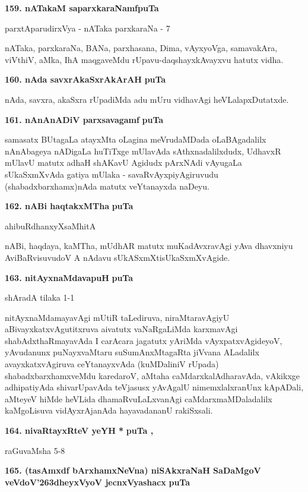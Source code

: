 \medskip
\noindent
\textbf{159. nATakaM saparxkaraNamf}\hfill{\bf puTa }

\hfill{parxtAparudirxVya - nATaka parxkaraNa - 7}

\smallskip
nATaka, parxkaraNa, BANa, parxhasana, Dima, vAyxyoVga, samavakAra, viVthiV, aMka, IhA maqgaveMdu rUpavu-daqshayxkAvayxvu hatutx vidha.

\medskip
\noindent
\textbf{160. nAda savxrAkaSxrAkArAH} \hfill{\bf puTa }

\smallskip
nAda, savxra, akaSxra rUpadiMda adu mUru vidhavAgi heVLalapxDutatxde.


\medskip
\noindent
\textbf{161. nAnAnADiV parxsavagamf} \hfill{\bf puTa }

\smallskip
samasatx BUtagaLa atayxMta oLagina meVrudaMDada oLaBAgadalilx nAnAbageya nADigaLa huTiTxge mUlavAda sAthxnadalilxdudx, UdhavxR mUlavU matutx adhaH shAKavU Agidudx pArxNAdi vAyugaLa sUkaSxmXvAda gatiya mUlaka - savaRvAyxpiyAgiruvudu (shabadxbarxhamx)nAda matutx veYtanayxda naDeyu.

\eject

\noindent
\textbf{162. nABi haqtakxMTha} \hfill{\bf puTa }

\hfill{ahibuRdhanxyXsaMhitA}

\smallskip
nABi, haqdaya, kaMTha, mUdhAR matutx muKadAvxravAgi yAva dhavxniyu AviBaRvisuvudoV A nAdavu sUkASxmXtisUkaSxmXvAgide. 

\medskip
\noindent
\textbf{163. nitAyxnaMdavapuH} \hfill{\bf puTa }

\hfill{shAradA tilaka 1-1}

\smallskip
nitAyxnaMdamayavAgi mUtiR taLediruva, niraMtaravAgiyU aBivayxkatxvAgutitxruva aivatutx vaNaRgaLiMda karxmavAgi shabAdxthaRmayavAda I carAcara jagatutx yAriMda vAyxpatxvAgideyoV, yAvudanunx puNayxvaMtaru suSumAnxMtagaRta \hbox{jiVvana} ALadalilx avayxkatxvAgiruva ceYtanayxvAda (kuMDaliniV rUpada) shabadxbarxhamxveMdu karedaroV, aMtaha caMdarxkalAdharavAda, vAkikxge adhipatiyAda shivarUpavAda teVjasusx yAvAgalU nimemxlalxranUnx kApADali, aMteyeV hiMde heVLida dhamaRvuLaLxvanAgi caMdarxmaMDaladalilx kaMgoLisuva vidAyxrAjanAda hayavadananU rakiSxsali.

\medskip
\noindent
\textbf{164. nivaRtayxRteV yeYH *} \hfill{\bf puTa , }

\hfill{raGuvaMsha 5-8}

\medskip
\noindent
\textbf{165. (tasAmxdf bArxhamxNeVna) niSAkxraNaH SaDaMgoV veVdoV\char'263dheyxVyoV jecnxVyashacx} \hfill{\bf puTa }

